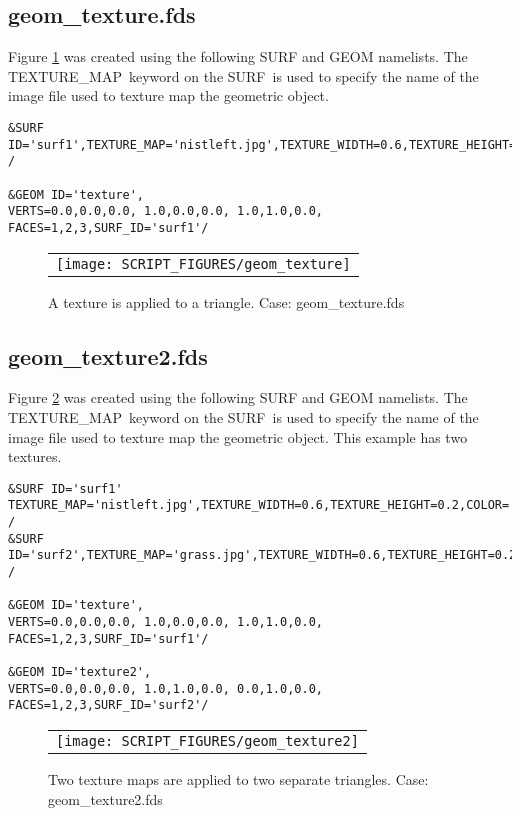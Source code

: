 \documentclass[12pt]{article}
\begin{document}
\subsection{geom\_texture.fds}
Figure \ref{fig:geom_texture} was created using the following SURF and GEOM namelists.
The {\ct TEXTURE\_MAP}\ keyword on the {\ct SURF}\ is used to specify the name of the image
file used to texture map the geometric object.

{\small
\begin{verbatim}
&SURF ID='surf1',TEXTURE_MAP='nistleft.jpg',TEXTURE_WIDTH=0.6,TEXTURE_HEIGHT=0.2,COLOR='BLUE' /

&GEOM ID='texture',
VERTS=0.0,0.0,0.0, 1.0,0.0,0.0, 1.0,1.0,0.0,
FACES=1,2,3,SURF_ID='surf1'/
\end{verbatim}
}

\begin{figure}
\begin{center}
\begin{tabular}{c}
 \texttt{[image: SCRIPT\_FIGURES/geom\_texture]}
  \end{tabular}
\end{center}
 \caption{A texture is applied to a triangle. Case: geom\_texture.fds}
\label{fig:geom_texture}
\end{figure}

\subsection{geom\_texture2.fds}
Figure \ref{fig:geom_texture2} was created using the following SURF and GEOM namelists.
The {\ct TEXTURE\_MAP}\ keyword on the {\ct SURF}\ is used to specify the name of the image
file used to texture map the geometric object. This example has two textures.

{\small
\begin{verbatim}
&SURF ID='surf1' TEXTURE_MAP='nistleft.jpg',TEXTURE_WIDTH=0.6,TEXTURE_HEIGHT=0.2,COLOR='BLUE' /
&SURF ID='surf2',TEXTURE_MAP='grass.jpg',TEXTURE_WIDTH=0.6,TEXTURE_HEIGHT=0.2,COLOR='GREEN' /

&GEOM ID='texture',
VERTS=0.0,0.0,0.0, 1.0,0.0,0.0, 1.0,1.0,0.0,
FACES=1,2,3,SURF_ID='surf1'/

&GEOM ID='texture2',
VERTS=0.0,0.0,0.0, 1.0,1.0,0.0, 0.0,1.0,0.0,
FACES=1,2,3,SURF_ID='surf2'/
\end{verbatim}
}

\begin{figure}
\begin{center}
\begin{tabular}{c}
 \texttt{[image: SCRIPT\_FIGURES/geom\_texture2]}
  \end{tabular}
\end{center}
 \caption{Two texture maps are applied to two separate triangles.  Case: geom\_texture2.fds}
\label{fig:geom_texture2}
\end{figure}
\end{document}
